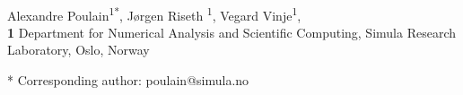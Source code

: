 \documentclass[10pt,letterpaper]{article}
\newcommand{\1}{^{(1)}}
\newcommand{\2}{^{(2)}}
\begin{document}
\vspace*{0.2in}

\begin{flushleft}
{\Large
\textbf{} %
}
\newline
\\
Alexandre Poulain\textsuperscript{1*},
Jørgen Riseth \textsuperscript{1},
Vegard Vinje\textsuperscript{1},
\\
\bigskip
\textbf{1} Department for Numerical Analysis and Scientific Computing, Simula Research Laboratory, Oslo, Norway
\\
\bigskip

% 
%





* Corresponding author: poulain@simula.no

\end{flushleft}
\end{document}

